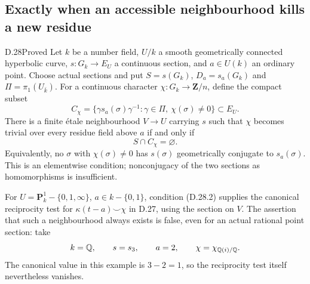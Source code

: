 \subsection{Exactly when an accessible neighbourhood kills a new residue}

\begin{claim}{D.28}{Proved}\label{clm:D28}
Let $k$ be a number field, $U/k$ a smooth geometrically connected
hyperbolic curve, $s:G_k\to E_U$ a continuous section, and $a\in U(k)$
an ordinary point. Choose actual sections and put
$S=s(G_k)$, $D_a=s_a(G_k)$ and $\Pi=\pi_1(U_{\bar k})$.
For a continuous character $\chi:G_k\to\mathbf Z/n$, define the
compact subset
\[
 C_\chi=\{\gamma s_a(\sigma)\gamma^{-1}:
       \gamma\in\Pi,\ \chi(\sigma)\ne0\}\subset E_U.
                                                               \tag{D.28.1}
\]
There is a finite \'etale neighbourhood $V\to U$ carrying $s$ such
that $\chi$ becomes trivial over every residue field above $a$ if
and only if
\[
                         S\cap C_\chi=\varnothing.             \tag{D.28.2}
\]
Equivalently, no $\sigma$ with $\chi(\sigma)\ne0$ has
$s(\sigma)$ geometrically conjugate to $s_a(\sigma)$.
This is an elementwise condition; nonconjugacy of the two sections
as homomorphisms is insufficient.

For $U=\mathbf P^1_k-\{0,1,\infty\}$, $a\in k-\{0,1\}$,
condition (D.28.2) supplies the canonical reciprocity test for
$\kappa(t-a)\smile\chi$ in D.27, using the section on $V$.
The assertion that such a neighbourhood always exists is false,
even for an actual rational point section: take
\[
       k=\mathbb Q,\qquad s=s_3,\qquad a=2,\qquad
       \chi=\chi_{\mathbb Q(i)/\mathbb Q}.
\]
The canonical value in this example is $3-2=1$, so the reciprocity
test itself nevertheless vanishes.
\end{claim}
